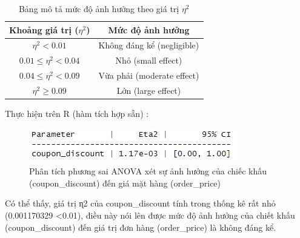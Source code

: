 \begin{table}[ht]
    \centering
    \begin{tabular}{|c|c|}
    \hline
    \textbf{Khoảng giá trị ($\eta^2$)} & \textbf{Mức độ ảnh hưởng} \\ 
    \hline
    $\eta^2 < 0.01$ & Không đáng kể (negligible) \\ 
    \hline
    $0.01 \leq \eta^2 < 0.04$ & Nhỏ (small effect) \\ 
    \hline
    $0.04 \leq \eta^2 < 0.09$ & Vừa phải (moderate effect) \\ 
    \hline
    $\eta^2 \geq 0.09$ & Lớn (large effect) \\ 
    \hline
    \end{tabular}
    \caption{Bảng mô tả mức độ ảnh hưởng theo giá trị $\eta^2$}
    \label{table:effect_size}
\end{table}

Thực hiện trên R (hàm tích hợp sẵn) :
\begin{figure}[!htbp]
    \centering
    \includegraphics[width=0.6\linewidth]{graphics/5.3.3.png}
    \caption{Phân tích phương sai ANOVA xét sự ảnh hưởng của chiếc khấu (coupon\_discount) đến giá mặt hàng (order\_price)}
\end{figure}

Có thể thấy, giá trị ɳ2  của  coupon\_discount  tính trong thống kê rất nhỏ (0.001170329 <0.01), điều này nói lên được mức độ ảnh hưởng của chiết khấu (coupon\_discount) đến giá trị đơn hàng (order\_price) là không đáng kể.